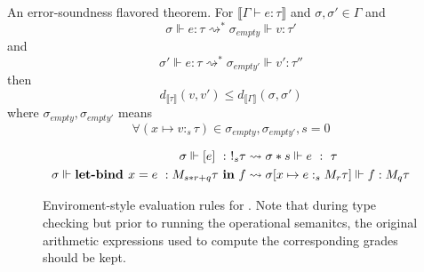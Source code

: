 An error-soundness flavored theorem. For $\llbracket \Gamma \vdash e : \tau
\rrbracket$ and $\sigma, \sigma' \in \Gamma$ and
$$\sigma \Vdash e : \tau \rightsquigarrow^* \sigma_{empty} \Vdash v : \tau'$$ 
and 
$$\sigma' \Vdash e : \tau \rightsquigarrow^* \sigma_{empty'} \Vdash v' : \tau''$$
then
$$
d_{\llbracket \tau \rrbracket}(v, v') \leq d_{\llbracket \Gamma \rrbracket}(\sigma, \sigma')
$$
where $\sigma_{empty}, \sigma_{empty'}$ means
$$
\forall (x \mapsto v :_s \tau) \in \sigma_{empty}, \sigma_{empty'}, s = 0
$$

\begin{figure}
\begin{center}
\begin{equation*}
  \begin{aligned}[c]
    \sigma \Vdash [e] \ : \ !_s \tau &\rightsquigarrow \sigma * s \Vdash e \ : \ \tau \\
    \sigma \Vdash \textbf{let-bind } x = e \ : M_{s * r + q} \tau \ \textbf{in} \ f &\rightsquigarrow \sigma[x
    \mapsto e :_s M_r \tau]
    \Vdash f : M_q \tau \\
  \end{aligned}
\end{equation*}

\end{center}
    \caption{Enviroment-style evaluation rules for \Lang. Note that during type
    checking but prior to running the operational semanitcs, the original
    arithmetic expressions used to compute the corresponding grades should be
    kept.}
    \label{fig:sub_eval_rules}
\end{figure}
